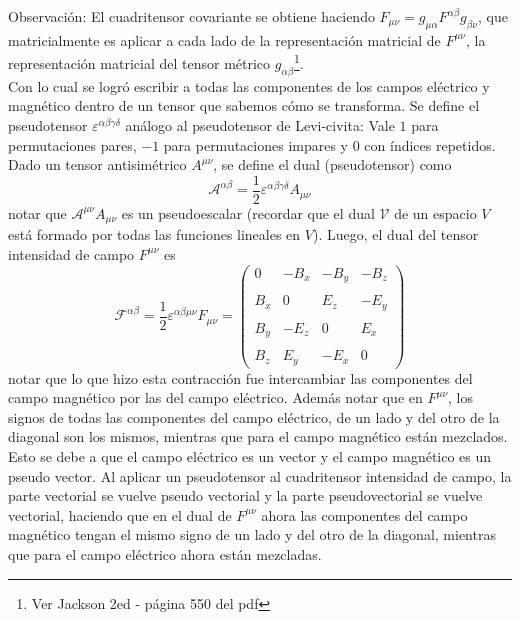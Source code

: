 Observación: El cuadritensor covariante se obtiene haciendo $F_{\mu\nu} = g_{\mu\alpha}F^{\alpha\beta}g_{\beta\nu}$, que matricialmente es aplicar a cada lado de la representación matricial de $F^{\mu\nu}$, la representación matricial del tensor métrico $g_{\alpha\beta}$\footnote{Ver Jackson 2ed - página 550 del pdf}.\\
\indent Con lo cual se logró escribir a todas las componentes de los campos eléctrico y magnético dentro de un tensor que sabemos cómo se transforma. Se define el pseudotensor $\varepsilon^{\alpha\beta\gamma\delta}$ análogo al pseudotensor de Levi-civita: Vale $1$ para permutaciones pares, $-1$ para permutaciones impares y $0$ con índices repetidos.\\
\indent Dado un tensor antisimétrico $A^{\mu\nu}$, se define el dual (pseudotensor) como
\begin{equation*}
    \mathcal{A}^{\alpha\beta} = 
    \frac{1}{2}\varepsilon^{\alpha\beta\gamma\delta}A_{\mu\nu}
\end{equation*}
notar que $\mathcal{A}^{\mu\nu}A_{\mu\nu}$ es un pseudoescalar (recordar que el dual $\mathcal{V}$ de un espacio $V$ está formado por todas las funciones lineales en $V$). Luego, el dual del tensor intensidad de campo $F^{\mu\nu}$ es
\begin{equation*}
    \mathcal{F}^{\alpha\beta} = \frac{1}{2} \varepsilon^{\alpha\beta\mu\nu}
    F_{\mu\nu} 
    =
    \left(
        \begin{matrix}
            0       & -B_{x} & -B_{y} & -B_{z}\\
            & & & \\
            B_{x}   & 0      &  E_{z} &  -E_{y}\\
            & & & \\
            B_{y}   & -E_{z} & 0      &  E_{x}\\
            & & & \\
            B_{z}   &  E_{y} & -E_{x} &   0
        \end{matrix}
    \right)
\end{equation*}
notar que lo que hizo esta contracción fue intercambiar las componentes del campo magnético por las del campo eléctrico. Además notar que en $F^{\mu\nu}$, los signos de todas las componentes del campo eléctrico, de un lado y del otro de la diagonal son los mismos, mientras que para el campo magnético están mezclados. Esto se debe a que el campo eléctrico es un vector y el campo magnético es un pseudo vector. Al aplicar un pseudotensor al cuadritensor intensidad de campo, la parte vectorial se vuelve pseudo vectorial y la parte pseudovectorial se vuelve vectorial, haciendo que en el dual de $F^{\mu\nu}$ ahora las componentes del campo magnético tengan el mismo signo de un lado y del otro de la diagonal, mientras que para el campo eléctrico ahora están mezcladas.\\

